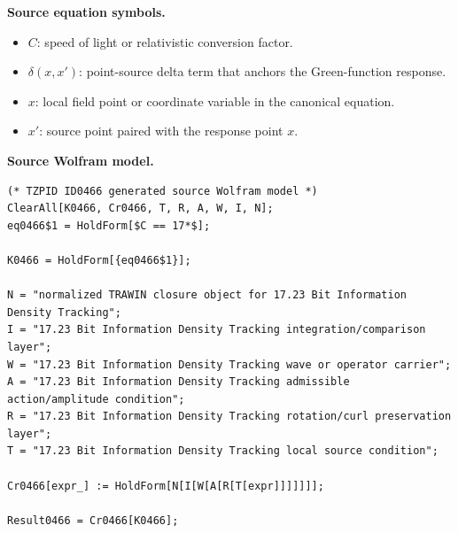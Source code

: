 \begin{minipage}[t]{0.49\linewidth}
\begingroup
\small
\raggedright
\textbf{Source equation symbols.}\par
\begin{itemize}[leftmargin=1.35em,itemsep=1pt,topsep=1pt,parsep=0pt]
    \item $C$: speed of light or relativistic conversion factor.
    \item $\delta(x,x')$: point-source delta term that anchors the Green-function response.
    \item $x$: local field point or coordinate variable in the canonical equation.
    \item $x'$: source point paired with the response point $x$.
\end{itemize}
\endgroup
\end{minipage}\hfill
\begin{minipage}[t]{0.47\linewidth}
\begingroup
\scriptsize
\raggedright
\textbf{Source Wolfram model.}\par
\begin{Verbatim}[fontsize=\tiny,breaklines=true,breakanywhere=true]
(* TZPID ID0466 generated source Wolfram model *)
ClearAll[K0466, Cr0466, T, R, A, W, I, N];
eq0466$1 = HoldForm[$C == 17*$];

K0466 = HoldForm[{eq0466$1}];

N = "normalized TRAWIN closure object for 17.23 Bit Information Density Tracking";
I = "17.23 Bit Information Density Tracking integration/comparison layer";
W = "17.23 Bit Information Density Tracking wave or operator carrier";
A = "17.23 Bit Information Density Tracking admissible action/amplitude condition";
R = "17.23 Bit Information Density Tracking rotation/curl preservation layer";
T = "17.23 Bit Information Density Tracking local source condition";

Cr0466[expr_] := HoldForm[N[I[W[A[R[T[expr]]]]]]];

Result0466 = Cr0466[K0466];
\end{Verbatim}
\endgroup
\end{minipage}

